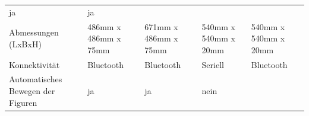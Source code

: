 \begin{longtable}[]{@{}lllll@{}}
\begin{minipage}[t]{0.15\columnwidth}
ja\strut
\end{minipage} & \begin{minipage}[t]{0.13\columnwidth}\raggedright
ja\strut
\end{minipage}\tabularnewline
\begin{minipage}[t]{0.19\columnwidth}\raggedright
Abmessungen (LxBxH)\strut
\end{minipage} & \begin{minipage}[t]{0.19\columnwidth}\raggedright
486mm x 486mm x 75mm\strut
\end{minipage} & \begin{minipage}[t]{0.20\columnwidth}\raggedright
671mm x 486mm x 75mm\strut
\end{minipage} & \begin{minipage}[t]{0.15\columnwidth}\raggedright
540mm x 540mm x 20mm\strut
\end{minipage} & \begin{minipage}[t]{0.13\columnwidth}\raggedright
540mm x 540mm x 20mm\strut
\end{minipage}\tabularnewline
\begin{minipage}[t]{0.19\columnwidth}\raggedright
Konnektivität\strut
\end{minipage} & \begin{minipage}[t]{0.19\columnwidth}\raggedright
Bluetooth\strut
\end{minipage} & \begin{minipage}[t]{0.20\columnwidth}\raggedright
Bluetooth\strut
\end{minipage} & \begin{minipage}[t]{0.15\columnwidth}\raggedright
Seriell\strut
\end{minipage} & \begin{minipage}[t]{0.13\columnwidth}\raggedright
Bluetooth\strut
\end{minipage}\tabularnewline
\begin{minipage}[t]{0.19\columnwidth}\raggedright
Automatisches Bewegen der Figuren\strut
\end{minipage} & \begin{minipage}[t]{0.19\columnwidth}\raggedright
ja\strut
\end{minipage} & \begin{minipage}[t]{0.20\columnwidth}\raggedright
ja\strut
\end{minipage} & \begin{minipage}[t]{0.15\columnwidth}\raggedright
nein\strut
\end{minipage} & \begin{minipage}[t]{0.13\columnwidth}\raggedright

\end{minipage}
\end{longtable}

